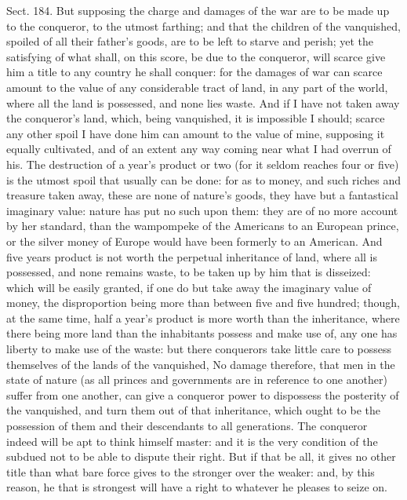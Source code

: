 \documentclass[11pt,openany]{book}
\begin{document}
Sect. 184. But supposing the charge and damages of the war are to be made up to the conqueror, to the utmost farthing; and that the children of the vanquished, spoiled of all their father's goods, are to be left to starve and perish; yet the satisfying of what shall, on this score, be due to the conqueror, will scarce give him a title to any country he shall conquer: for the damages of war can scarce amount to the value of any considerable tract of land, in any part of the world, where all the land is possessed, and none lies waste. And if I have not taken away the conqueror's land, which, being vanquished, it is impossible I should; scarce any other spoil I have done him can amount to the value of mine, supposing it equally cultivated, and of an extent any way coming near what I had overrun of his. The destruction of a year's product or two (for it seldom reaches four or five) is the utmost spoil that usually can be done: for as to money, and such riches and treasure taken away, these are none of nature's goods, they have but a fantastical imaginary value: nature has put no such upon them: they are of no more account by her standard, than the wampompeke of the Americans to an European prince, or the silver money of Europe would have been formerly to an American. And five years product is not worth the perpetual inheritance of land, where all is possessed, and none remains waste, to be taken up by him that is disseized: which will be easily granted, if one do but take away the imaginary value of money, the disproportion being more than between five and five hundred; though, at the same time, half a year's product is more worth than the inheritance, where there being more land than the inhabitants possess and make use of, any one has liberty to make use of the waste: but there conquerors take little care to possess themselves of the lands of the vanquished, No damage therefore, that men in the state of nature (as all princes and governments are in reference to one another) suffer from one another, can give a conqueror power to dispossess the posterity of the vanquished, and turn them out of that inheritance, which ought to be the possession of them and their descendants to all generations. The conqueror indeed will be apt to think himself master: and it is the very condition of the subdued not to be able to dispute their right. But if that be all, it gives no other title than what bare force gives to the stronger over the weaker: and, by this reason, he that is strongest will have a right to whatever he pleases to seize on.
\end{document}
